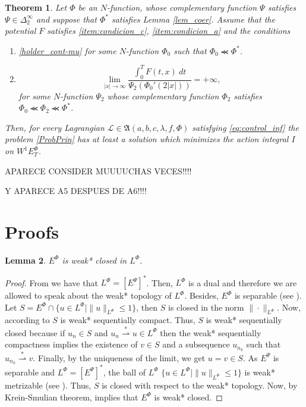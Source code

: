 \documentclass[twoside]{article}
\newtheorem{thm}{Theorem}[section]
\newtheorem{lem}[thm]{Lemma}
\theoremstyle{remark}
\newcommand{\orlnor}{\|_{L^{\Phi}}}
\newcommand{\lphi}{L^{\Phi}}
\newcommand{\ephi}{E^{\Phi}}
\newcommand{\wphie}{W^{1}\ephi}
\renewcommand{\leq}{\leqslant}
\newcommand{\epsi}{E^{\Psi}}
\begin{document}
\begin{thm}\label{coercitividad-r} Let $\Phi$ be an $N$-function, whose complementary function $\Psi$ satisfies  $\Psi\in\Delta_2^{\infty}$ and suppose that $\Phi^*$ satisfies  Lemma \ref{lem_coer}. Assume that the potential $F$ satisfies \ref{item:condicion_c}, \ref{item:condicion_a} and the conditions

\begin{enumerate}
 \item  \eqref{holder_cont-mu}  for some
 $N$-function  $\Phi_0$ such that $\Phi_0\llcurly\Phi^*$.

 \item \begin{equation}\label{eq:propiedad-coercividad-phi0}
\lim_{|x|\to\infty}\frac{\int_{0}^{T}F(t,x)\ dt}{\Psi_2(\Phi_0'(2|x|))}=+\infty,\tag{$A_5$}
\end{equation}
for some $N$-function $\Psi_2$ whose complementary function $\Phi_2$ satisfies $\Phi_0\llcurly \Phi_2\llcurly \Phi^*$.
\end{enumerate}
Then,  for every Lagrangian $\mathcal{L}\in \mathfrak{A}(a,b,c,\lambda,f,\Phi)$ satisfying \eqref{eq:control_inf} the problem \eqref{ProbPrin} has at least a solution which minimizes the action integral $I$ on $\wphie_T$.
\end{thm}


APARECE CONSIDER MUUUUCHAS VECES!!!!

Y APARECE A5 DESPUES DE A6!!!!

\section{Proofs}\label{sec:proofs}



\begin{lem}\label{lem:deb*cerrado}
$\ephi$ is weak* closed in $\lphi$.
\end{lem}


\begin{proof}
From \cite[Thm. 7, p. 110]{rao1991theory} we have that $\lphi=\left[\epsi\right]^*
$.
Then, $\lphi$ is a dual and therefore we are allowed to speak about the weak* topology of $\lphi$.
Besides, $\ephi
$ is separable (see \cite[Thm. 1, p. 87]{rao1991theory}).
Let $S=\ephi\cap \{u \in \lphi|\|u\orlnor\leq 1\}$, then $S$ is closed in the norm $\|\cdot\orlnor$. 
Now, according to \cite[Cor. 5, p. 148]{rao1991theory} $S$ is weak* sequentially compact. 
Thus, $S$ is weak* sequentially closed because if $u_n\in S$ and
$u_n \overset{*}{\rightharpoonup}u \in \lphi$ then  the weak* sequentially compactness implies the existence of $v \in S$ and a subsequence $u_{n_k}$ such that
$u_{n_k}\overset{*}{\rightharpoonup}v$. Finally, by the uniqueness of   the limit, we get
$u=v\in S$.
As $\epsi$ is separable and $\lphi=\left[\epsi\right]^*$, the ball of $\lphi$ $\{u \in \lphi | \|u\orlnor\leq 1\}$ is  weak* metrizable (see \cite[Thm. 5.1, p. 138]{Conway1977}).
Thus, $S$ is closed with respect to  the weak* topology. Now, by  Krein-Smulian theorem, \cite[Cor. 12.6, p. 165]{Conway1977} implies that $\ephi$ is weak* closed.
\end{proof}
\end{document}
